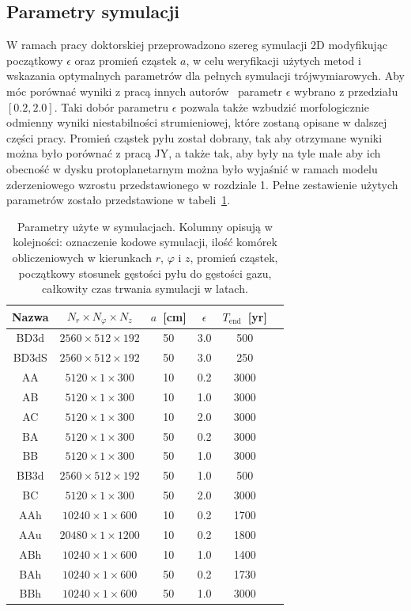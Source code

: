 \subsection{Parametry symulacji}\label{ch2:simpar}
%
W ramach pracy doktorskiej przeprowadzono szereg symulacji 2D modyfikując
początkowy $\epsilon$ oraz promień cząstek $a$, w celu weryfikacji użytych metod
i wskazania optymalnych parametrów dla pełnych symulacji trójwymiarowych. Aby
móc porównać wyniki z pracą innych autorów~\citep{JY07} parametr $\epsilon$
wybrano z przedziału $[0.2, 2.0]$. Taki dobór parametru $\epsilon$ pozwala także
wzbudzić morfologicznie odmienny wyniki niestabilności strumieniowej, które
zostaną opisane w dalszej części pracy. Promień cząstek pyłu został dobrany, tak
aby otrzymane wyniki można było porównać z pracą JY, a także tak, aby były na
tyle małe aby ich obecność w dysku protoplanetarnym można było wyjaśnić w ramach
modelu zderzeniowego wzrostu przedstawionego w rozdziale 1. Pełne zestawienie
użytych parametrów zostało przedstawione w tabeli~\ref{tab1}.

\begin{table}
   \centering
   \begin{tabular}{cccccc}
      \hline
      Nazwa & $N_r \times N_\varphi \times N_z$ &
      $a$~[cm] & $\epsilon$ & $T_\textrm{end}$~[yr] \\
      \hline
      BD3d  &  $2560  \times 512 \times 192$  & 50  & 3.0 & 500  \\
      BD3dS &  $2560  \times 512 \times 192$  & 50  & 3.0 & 250  \\
      AA    &  $5120  \times 1   \times 300$  & 10  & 0.2 & 3000 \\
      AB    &  $5120  \times 1   \times 300$  & 10  & 1.0 & 3000 \\
      AC    &  $5120  \times 1   \times 300$  & 10  & 2.0 & 3000 \\
      BA    &  $5120  \times 1   \times 300$  & 50  & 0.2 & 3000 \\
      BB    &  $5120  \times 1   \times 300$  & 50  & 1.0 & 3000 \\
      BB3d  &  $2560  \times 512 \times 192$  & 50  & 1.0 & 500  \\
      BC    &  $5120  \times 1   \times 300$  & 50  & 2.0 & 3000 \\
      AAh   &  $10240 \times 1   \times 600$  & 10  & 0.2 & 1700 \\
      AAu   &  $20480 \times 1   \times 1200$ & 10  & 0.2 & 1800 \\
      ABh   &  $10240 \times 1   \times 600$  & 10  & 1.0 & 1400 \\
      BAh   &  $10240 \times 1   \times 600$  & 50  & 0.2 & 1730 \\
      BBh   &  $10240 \times 1   \times 600$  & 50  & 1.0 & 3000 \\
      \hline
   \end{tabular}
\caption{Parametry użyte w symulacjach. Kolumny opisują w kolejności: oznaczenie
   kodowe symulacji, ilość komórek obliczeniowych w kierunkach $r$, $\varphi$ i
   $z$, promień cząstek, początkowy stosunek gęstości pyłu do gęstości gazu,
całkowity czas trwania symulacji w latach.}
\label{tab1}
\end{table}

